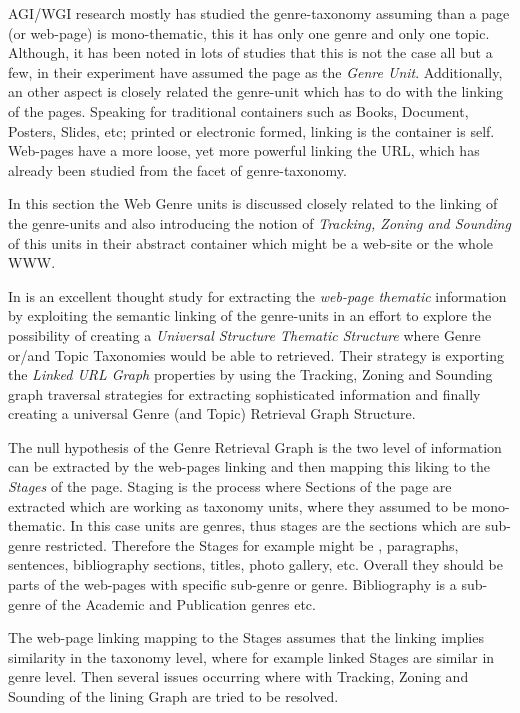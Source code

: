 AGI/WGI research mostly has studied the genre-taxonomy assuming than a page (or web-page) is mono-thematic, this it has only one genre and only one topic. Although, it has been noted in lots of studies that this is not the case all but a few, in their experiment have assumed the page as the \textit{Genre Unit}. Additionally, an other aspect is closely related the genre-unit which has to do with the linking of the pages. Speaking for traditional containers such as Books, Document, Posters, Slides, etc; printed or electronic formed, linking is the container is self. Web-pages have a more loose, yet more powerful linking the URL, which has already been studied from the facet of genre-taxonomy. 

In this section the Web Genre units is discussed closely related to the linking of the genre-units and also introducing the notion of \textit{Tracking, Zoning and Sounding} of this units in their abstract container which might be a web-site or the whole WWW. 

In \parencite{mehler2011integrating} is an excellent thought study for extracting the \textit{web-page thematic} information by exploiting the semantic linking of the genre-units in an effort to explore the possibility of creating a \textit{Universal Structure Thematic Structure} where Genre or/and Topic Taxonomies would be able to retrieved. Their strategy is exporting the \textit{Linked URL Graph} properties by using the Tracking, Zoning and Sounding graph traversal strategies for extracting sophisticated information and finally creating a universal Genre (and Topic) Retrieval Graph Structure.

The null hypothesis of the Genre Retrieval Graph is the two level of information can be extracted by the web-pages linking and then mapping this liking to the \textit{Stages} of the page. Staging is the process where Sections of the page are extracted which are working as taxonomy units, where they assumed to be mono-thematic. In this case units are genres, thus stages are the sections which are sub-genre restricted. Therefore the Stages for example might be , paragraphs, sentences, bibliography sections, titles, photo gallery, etc. Overall they should be parts of the web-pages with specific sub-genre or genre. Bibliography is a sub-genre of the Academic and Publication genres etc.

The web-page linking mapping to the Stages assumes that the linking implies similarity in the taxonomy level, where for example linked Stages are similar in genre level. Then several issues occurring where with Tracking, Zoning and Sounding of the lining Graph are tried to be resolved.

